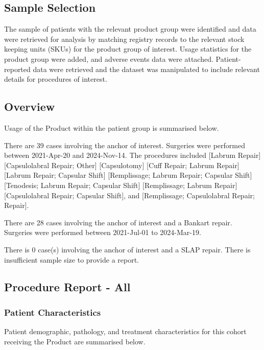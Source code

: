 \documentclass[
]{article}
\begin{document}
\subsection{Sample Selection}\label{sample-selection-6}

The sample of patients with the relevant product group were identified
and data were retrieved for analysis by matching registry records to the
relevant stock keeping units (SKUs) for the product group of interest.
Usage statistics for the product group were added, and adverse events
data were attached. Patient-reported data were retrieved and the dataset
was manipulated to include relevant details for procedures of interest.

\subsection{Overview}\label{overview-6}

Usage of the Product within the patient group is summarised below.

There are 39 cases involving the anchor of interest. Surgeries were
performed between 2021-Apr-20 and 2024-Nov-14. The procedures included
{[}Labrum Repair{]} {[}Capsulolabral Repair; Other{]} {[}Capsulotomy{]}
{[}Cuff Repair; Labrum Repair{]} {[}Labrum Repair; Capsular Shift{]}
{[}Remplissage; Labrum Repair; Capsular Shift{]} {[}Tenodesis; Labrum
Repair; Capsular Shift{]} {[}Remplissage; Labrum Repair{]}
{[}Capsulolabral Repair; Capsular Shift{]}, and {[}Remplissage;
Capsulolabral Repair; Repair{]}.

There are 28 cases involving the anchor of interest and a Bankart
repair. Surgeries were performed between 2021-Jul-01 to 2024-Mar-19.

There is 0 case(s) involving the anchor of interest and a SLAP repair.
There is insufficient sample size to provide a report.

\subsection{Procedure Report - All}\label{procedure-report---all-1}

\subsubsection{Patient
Characteristics}\label{patient-characteristics-12}

Patient demographic, pathology, and treatment characteristics for this
cohort receiving the Product are summarised below.
\end{document}

